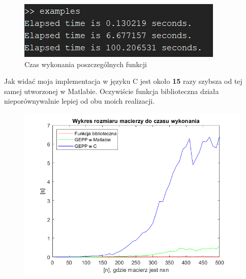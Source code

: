\documentclass[12pt, flegn, leqno]{article}
\begin{document}
        \begin{figure}[!ht]
            \includegraphics[width=\linewidth]{time.png}
            \caption{Czas wykonania poszczególnych funkcji}
            \label{fig:time1}
        \end{figure}

        Jak widać moja implementacja w języku C jest około \textbf{15} razy szybsza od tej samej 
        utworzonej w Matlabie. Oczywiście funkcja biblioteczna działa nieporównywalnie lepiej
        od obu moich realizacji.

        \begin{figure}[!ht]
            \includegraphics[width=\linewidth]{graph1.png}
            \label{fig:graph1}
        \end{figure}
\end{document}
